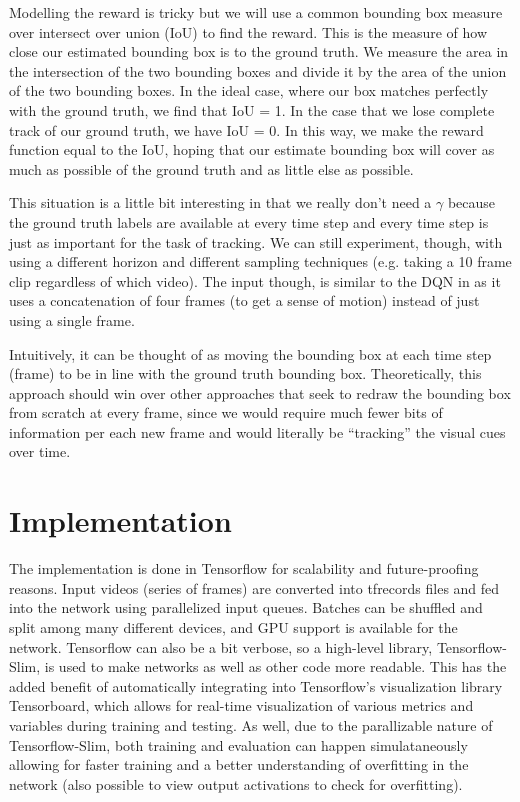 \documentclass[letterpaper,12pt,titlepage,oneside,final]{book}
\begin{document}
Modelling the reward is tricky but we will use a common bounding box measure over intersect over union (IoU) to find the reward. This is the measure of how close our estimated bounding box is to the ground truth. We measure the area in the intersection of the two bounding boxes and divide it by the area of the union of the two bounding boxes. In the ideal case, where our box matches perfectly with the ground truth, we find that IoU = 1. In the case that we lose complete track of our ground truth, we have IoU = 0. In this way, we make the reward function equal to the IoU, hoping that our estimate bounding box will cover as much as possible of the ground truth and as little else as possible.

This situation is a little bit interesting in that we really don't need a $\gamma$ because the ground truth labels are available at every time step and every time step is just as important for the task of tracking. We can still experiment, though, with using a different horizon and different sampling techniques (e.g. taking a 10 frame clip regardless of which video). The input though, is similar to the DQN in \cite{atari-dqn} as it uses a concatenation of four frames (to get a sense of motion) instead of just using a single frame.

Intuitively, it can be thought of as moving the bounding box at each time step (frame) to be in line with the ground truth bounding box. Theoretically, this approach should win over other approaches that seek to redraw the bounding box from scratch at every frame, since we would require much fewer bits of information per each new frame and would literally be ``tracking'' the visual cues over time.

\section{Implementation}
The implementation is done in Tensorflow for scalability and future-proofing reasons. Input videos (series of frames) are converted into tfrecords files and fed into the network using parallelized input queues. Batches can be shuffled and split among many different devices, and GPU support is available for the network. Tensorflow can also be a bit verbose, so a high-level library, Tensorflow-Slim, is used to make networks as well as other code more readable. This has the added benefit of automatically integrating into Tensorflow's visualization library Tensorboard, which allows for real-time visualization of various metrics and variables during training and testing. As well, due to the parallizable nature of Tensorflow-Slim, both training and evaluation can happen simulataneously allowing for faster training and a better understanding of overfitting in the network (also possible to view output activations to check for overfitting).
\end{document}
